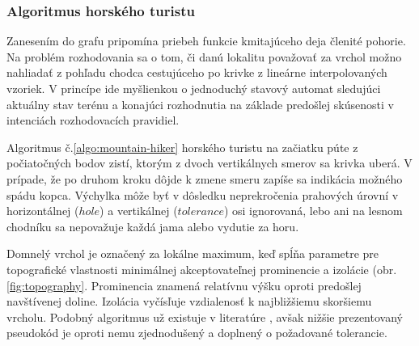 \subsubsection{Algoritmus horského turistu}
Zanesením do grafu pripomína priebeh funkcie kmitajúceho deja členité pohorie. Na problém rozhodovania sa o tom, či danú lokalitu
považovať za vrchol možno nahliadať z pohľadu chodca cestujúceho po krivke z lineárne interpolovaných vzoriek. V princípe
ide myšlienkou o jednoduchý stavový automat sledujúci aktuálny stav terénu a konajúci rozhodnutia na základe predošlej
skúsenosti v intenciách rozhodovacích pravidiel.

Algoritmus č.\ref{algo:mountain-hiker} horského turistu na začiatku púte z počiatočných bodov zistí, ktorým z dvoch vertikálnych
smerov sa krivka uberá. V prípade, že po druhom kroku dôjde k zmene smeru zapíše sa indikácia možného spádu kopca. 
Výchylka môže byť v dôsledku neprekročenia prahových úrovní v horizontálnej ($hole$) a vertikálnej ($tolerance$) osi 
ignorovaná, lebo ani na lesnom chodníku sa nepovažuje každá jama alebo vydutie za horu. 

Domnelý vrchol je označený za lokálne maximum, keď spĺňa parametre pre topografické vlastnosti minimálnej akceptovateľnej 
prominencie a izolácie (obr. \ref{fig:topography}. Prominencia znamená relatívnu výšku oproti predošlej navštívenej doline. Izolácia vyčísľuje vzdialenosť k najbližšiemu skoršiemu vrcholu. Podobný algoritmus už existuje v literatúre \cite{peek-mountaineer-method}, avšak nižšie prezentovaný pseudokód je oproti nemu zjednodušený a doplnený o požadované tolerancie.

